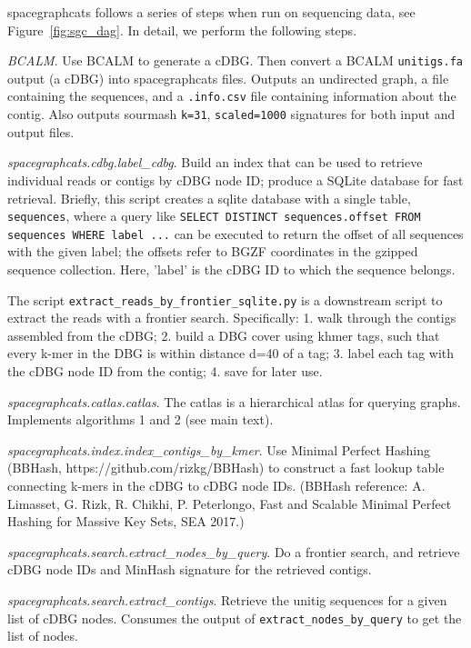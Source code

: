 \textsf{spacegraphcats} follows a series of steps when run on sequencing
data, see Figure~\ref{fig:sgc_dag}. In detail, we perform the following
steps.

\emph{BCALM}. Use BCALM to generate a cDBG. Then convert a BCALM {\tt unitigs.fa}
output (a cDBG) into spacegraphcats files.
Outputs an undirected graph, a file containing the sequences, and a
{\tt .info.csv} file containing information about the contig. Also outputs 
sourmash {\tt k=31}, {\tt scaled=1000} signatures for both input and
output files.

\emph{spacegraphcats.cdbg.label\_cdbg}. Build an index that can be
used to retrieve individual reads or contigs by cDBG node ID; produce 
a SQLite database for fast retrieval. Briefly, this script creates a 
sqlite database with a single table, {\tt sequences}, where a query like
{\tt SELECT DISTINCT sequences.offset FROM sequences WHERE label ...}
can be executed to return the offset of all sequences with the given
label; the offsets refer to BGZF coordinates in the gzipped sequence collection. Here, 'label' is the cDBG ID to which the sequence belongs.

The script {\tt extract\_reads\_by\_frontier\_sqlite.py} is a downstream script to
extract the reads with a frontier search.
Specifically: 1. walk through the contigs assembled from the cDBG;  
2. build a DBG cover using khmer tags, such that every k-mer in the DBG is 
within distance d=40 of a tag;  3. label each tag with the cDBG node ID 
from the contig; 4. save for later use.

\emph{spacegraphcats.catlas.catlas}. The catlas is a hierarchical 
atlas for querying graphs. Implements algorithms 1 and 2 (see main text).

\emph{spacegraphcats.index.index\_contigs\_by\_kmer}. Use Minimal Perfect 
Hashing (BBHash, https://github.com/rizkg/BBHash) to construct a fast
lookup table connecting k-mers in the cDBG to cDBG node IDs. (BBHash
reference: A. Limasset, G. Rizk, R. Chikhi, P. Peterlongo, Fast and
Scalable Minimal Perfect Hashing for Massive Key Sets, SEA 2017.)

\emph{spacegraphcats.search.extract\_nodes\_by\_query}. Do a frontier 
search, and retrieve cDBG node IDs and MinHash signature for the retrieved 
contigs.

\emph{spacegraphcats.search.extract\_contigs}. Retrieve the unitig sequences 
for a given list of cDBG nodes.  Consumes the output of {\tt extract\_nodes\_by\_query} 
to get the list of nodes.

